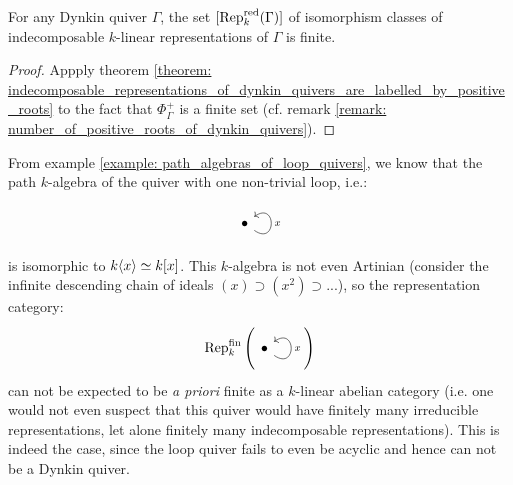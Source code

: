             \begin{corollary} \label{coro: dynkin_quivers_are_representation_finite}
                For any Dynkin quiver $\Gamma$, the set $[\mathrm{Rep}_k^{\mathrm{red}}(\Gamma)]$ of isomorphism classes of indecomposable $k$-linear representations of $\Gamma$ is finite. 
            \end{corollary}
                \begin{proof}
                    Appply theorem \ref{theorem: indecomposable_representations_of_dynkin_quivers_are_labelled_by_positive_roots} to the fact that $\Phi_{\Gamma}^+$ is a finite set (cf. remark \ref{remark: number_of_positive_roots_of_dynkin_quivers}).
                \end{proof}
            
            \begin{example}
                
            \end{example}
            \begin{example}
                
            \end{example}
            \begin{example}
                
            \end{example}
            \begin{example}
                From example \ref{example: path_algebras_of_loop_quivers}, we know that the path $k$-algebra of the quiver with one non-trivial loop, i.e.:
                    $$
                        \begin{tikzcd}
                            \bullet \arrow["x"', loop, distance=2em, in=35, out=325]
                        \end{tikzcd}
                    $$
                is isomorphic to $k\langle x\rangle \simeq k[x]$. This $k$-algebra is not even Artinian (consider the infinite descending chain of ideals $(x) \supset (x^2) \supset ...$), so the representation category:
                    $$\Rep_k^{\fin}\left(\begin{tikzcd}\bullet \arrow["x"', loop, distance=2em, in=35, out=325]\end{tikzcd}\right)$$
                can not be expected to be \textit{a priori} finite as a $k$-linear abelian category (i.e. one would not even suspect that this quiver would have finitely many irreducible representations, let alone finitely many indecomposable representations). This is indeed the case, since the loop quiver fails to even be acyclic and hence can not be a Dynkin quiver.
            \end{example}
            \begin{example}
                
            \end{example}
        
